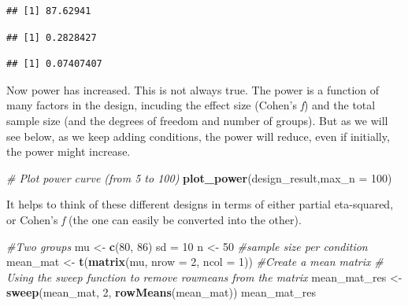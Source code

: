 \documentclass[]{book}
\newenvironment{Shaded}{\begin{snugshade}}{\end{snugshade}}
\newcommand{\CommentTok}[1]{\textcolor[rgb]{0.56,0.35,0.01}{\textit{#1}}}
\newcommand{\DataTypeTok}[1]{\textcolor[rgb]{0.13,0.29,0.53}{#1}}
\newcommand{\DecValTok}[1]{\textcolor[rgb]{0.00,0.00,0.81}{#1}}
\newcommand{\KeywordTok}[1]{\textcolor[rgb]{0.13,0.29,0.53}{\textbf{#1}}}
\newcommand{\NormalTok}[1]{#1}
\newcommand{\OperatorTok}[1]{\textcolor[rgb]{0.81,0.36,0.00}{\textbf{#1}}}
\newcommand{\StringTok}[1]{\textcolor[rgb]{0.31,0.60,0.02}{#1}}
\begin{document}
\begin{verbatim}
## [1] 87.62941
\end{verbatim}

\begin{Shaded}
\end{Shaded}

\begin{verbatim}
## [1] 0.2828427
\end{verbatim}

\begin{Shaded}
\end{Shaded}

\begin{verbatim}
## [1] 0.07407407
\end{verbatim}

Now power has increased. This is not always true. The power is a function of many factors in the design, incuding the effect size (Cohen's \emph{f}) and the total sample size (and the degrees of freedom and number of groups). But as we will see below, as we keep adding conditions, the power will reduce, even if initially, the power might increase.

\begin{Shaded}
\begin{Highlighting}[]
\CommentTok{# Plot power curve (from 5 to 100)}
\KeywordTok{plot_power}\NormalTok{(design_result,}\DataTypeTok{max_n =} \DecValTok{100}\NormalTok{)}
\end{Highlighting}
\end{Shaded}

It helps to think of these different designs in terms of either partial eta-squared, or Cohen's \emph{f} (the one can easily be converted into the other).

\begin{Shaded}
\begin{Highlighting}[]
\CommentTok{#Two groups}
\NormalTok{mu <-}\StringTok{ }\KeywordTok{c}\NormalTok{(}\DecValTok{80}\NormalTok{, }\DecValTok{86}\NormalTok{)}
\NormalTok{sd =}\StringTok{ }\DecValTok{10}
\NormalTok{n <-}\StringTok{ }\DecValTok{50} \CommentTok{#sample size per condition}
\NormalTok{mean_mat <-}\StringTok{ }\KeywordTok{t}\NormalTok{(}\KeywordTok{matrix}\NormalTok{(mu,}
\DataTypeTok{nrow =} \DecValTok{2}\NormalTok{,}
\DataTypeTok{ncol =} \DecValTok{1}\NormalTok{)) }\CommentTok{#Create a mean matrix}
\CommentTok{# Using the sweep function to remove rowmeans from the matrix}
\NormalTok{mean_mat_res <-}\StringTok{ }\KeywordTok{sweep}\NormalTok{(mean_mat, }\DecValTok{2}\NormalTok{, }\KeywordTok{rowMeans}\NormalTok{(mean_mat))}
\NormalTok{mean_mat_res}
\end{Highlighting}
\end{Shaded}
\end{document}
